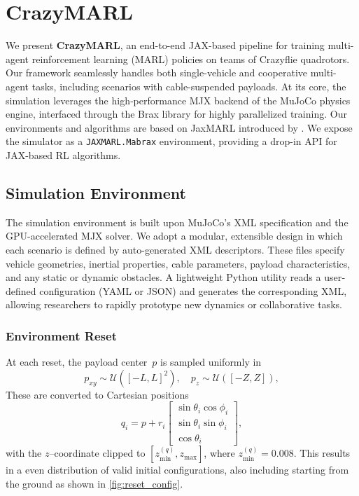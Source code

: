 \chapter{CrazyMARL}
We present \textbf{CrazyMARL}, an end-to-end JAX-based pipeline for training multi-agent reinforcement learning (MARL) policies on teams of Crazyflie quadrotors. Our framework seamlessly handles both single-vehicle and cooperative multi-agent tasks, including scenarios with cable-suspended payloads. At its core, the simulation leverages the high‐performance MJX backend of the MuJoCo physics engine, interfaced through the Brax library for highly parallelized training. Our environments and algorithms are based on JaxMARL introduced by \autocite{flair2023jaxmarl}. We expose the simulator as a \texttt{JAXMARL.Mabrax} environment, providing a drop-in API for JAX-based RL algorithms.

\section{Simulation Environment}
The simulation environment is built upon MuJoCo's XML specification and the GPU-accelerated MJX solver. We adopt a modular, extensible design in which each scenario is defined by auto-generated XML descriptors. These files specify vehicle geometries, inertial properties, cable parameters, payload characteristics, and any static or dynamic obstacles. A lightweight Python utility reads a user‐defined configuration (YAML or JSON) and generates the corresponding XML, allowing researchers to rapidly prototype new dynamics or collaborative tasks. 
\subsection{Environment Reset}
At each reset, the payload center~$p$ is sampled uniformly in
\[
p_{xy}\sim\mathcal{U}([-L,L]^2),\quad p_z\sim\mathcal{U}([-Z,Z]),
\]
These are converted to Cartesian positions
\[
q_i = p + r_i
\begin{bmatrix}
\sin\theta_i\cos\phi_i\\
\sin\theta_i\sin\phi_i\\
\cos\theta_i
\end{bmatrix},
\]
with the $z$–coordinate clipped to $[z_{\min}^{(q)},z_{\max}]$, where $z_{\min}^{(q)}=0.008$. 
This results in a even distribution of valid initial configurations, also including starting from the ground as shown in \autoref{fig:reset_config}.


